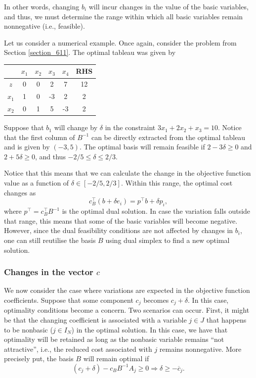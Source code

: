 In other words, changing $b_i$ will incur changes in the value of the basic variables, and thus, we must determine the range within which all basic variables remain nonnegative (i.e., feasible).

Let us consider a numerical example. Once again, consider the problem from Section \ref{section_611}. The optimal tableau was given by

\begin{center}
	\begin{tabular}{c|cccc|c} 
	   &$x_1$ & $x_2$ & $x_3$ & $x_4$& RHS \\ \hline	
	   $z$ & 0 & 0 & 2 & 7 & 12\\
	   $x_1$ & 1 & 0 & -3 & 2 & 2\\
	   $x_2$ & 0 & 1 & 5 & -3 & 2\\	            
	\end{tabular}	
\end{center}

Suppose that $b_1$ will change by $\delta$ in the constraint $3x_1 + 2x_2 + x_3  = 10$. Notice that the first column of $B^{-1}$ can be directly extracted from the optimal tableau and is given by $(-3,5)$. The optimal basis will remain feasible if $2 - 3\delta \geq 0$ and $2 + 5\delta \geq 0$, and thus $-2/5 \leq \delta \leq 2/3$.

Notice that this means that we can calculate the change in the objective function value as a function of $\delta \in [-2/5, 2/3]$. Within this range, the optimal cost changes as 
%
\begin{equation*}
	c_B^\top (b + \delta e_i) = p^\top b + \delta p_i,	
\end{equation*}
%
where $p^\top = c_B ^\top B^{-1}$ is the optimal dual solution. In case the variation falls outside that range, this means that some of the basic variables will become negative. However, since the dual feasibility conditions are not affected by changes in $b_i$, one can still reutilise the basis $B$ using dual simplex to find a new optimal solution.


\subsubsection{Changes in the vector $c$}

We now consider the case where variations are expected in the objective function coefficients. Suppose that some component $c_j$ becomes $c_j + \delta$. In this case, optimality conditions become a concern. Two scenarios can occur. First, it might be that the changing coefficient is associated with a variable $j \in J$ that happens to be nonbasic ($j \in I_N$) in the optimal solution. In this case, we have that optimality will be retained as long as the nonbasic variable remains ``not attractive'', i.e., the reduced cost associated with $j$ remains nonnegative. More precisely put, the basis $B$ will remain optimal if
%
\begin{equation*}
	(c_j + \delta) - c_BB^{-1}A_j \geq 0 \Rightarrow \delta \geq -\overline{c}_j.
\end{equation*}
%

